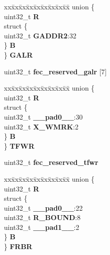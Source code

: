\begin{DoxyCompactItemize}
\begin{tabbing}
\end{tabbing}\item 
\mbox{\label{structFEC__tag_ae6a14cdfa0048aed218fa73fdb2d08c5}} 
\begin{tabbing}
xx\=xx\=xx\=xx\=xx\=xx\=xx\=xx\=xx\=\kill
union \{\\
\>uint32\_t {\bfseries R}\\
\>struct \{\\
\>\>uint32\_t {\bfseries GADDR2}:32\\
\>\} {\bfseries B}\\
\} {\bfseries GALR}\\

\end{tabbing}\item 
\mbox{\label{structFEC__tag_a44c9287ef9519af2bc10d20c8ea2d5d3}} 
uint32\+\_\+t {\bfseries fec\+\_\+reserved\+\_\+galr} \mbox{[}7\mbox{]}
\item 
\mbox{\label{structFEC__tag_a35ad3b77b1ae86584f2b7c274f57a3c4}} 
\begin{tabbing}
xx\=xx\=xx\=xx\=xx\=xx\=xx\=xx\=xx\=\kill
union \{\\
\>uint32\_t {\bfseries R}\\
\>struct \{\\
\>\>uint32\_t {\bfseries \_\_pad0\_\_}:30\\
\>\>uint32\_t {\bfseries X\_WMRK}:2\\
\>\} {\bfseries B}\\
\} {\bfseries TFWR}\\

\end{tabbing}\item 
\mbox{\label{structFEC__tag_af96627671b114d5ceec45d3a35608ed8}} 
uint32\+\_\+t {\bfseries fec\+\_\+reserved\+\_\+tfwr}
\item 
\mbox{\label{structFEC__tag_a550857dbee344f819514d172badea3fb}} 
\begin{tabbing}
xx\=xx\=xx\=xx\=xx\=xx\=xx\=xx\=xx\=\kill
union \{\\
\>uint32\_t {\bfseries R}\\
\>struct \{\\
\>\>uint32\_t {\bfseries \_\_pad0\_\_}:22\\
\>\>uint32\_t {\bfseries R\_BOUND}:8\\
\>\>uint32\_t {\bfseries \_\_pad1\_\_}:2\\
\>\} {\bfseries B}\\
\} {\bfseries FRBR}\\


\end{tabbing}
\end{DoxyCompactItemize}
